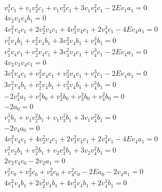 \documentclass{article}
\begin{document}
\begin{equation}
{\begin{array}{r}
v_{1}^{3} c_{1} + v_{1} v_{2}^{2} c_{1} + v_{1} v_{3}^{2} c_{1} + 3 v_{1} v_{4}^{2} c_{1} - 2 E v_{1} a_{1} = 0 \\
4 v_{2} v_{3} v_{4} b_{1} = 0 \\
4 v_{1}^{2} v_{4} c_{1} + 2 v_{2}^{2} v_{4} c_{1} + 4 v_{3}^{2} v_{4} c_{1} + 2 v_{4}^{3} c_{1} - 4 E v_{4} a_{1} = 0 \\
v_{1}^{2} v_{4} b_{1} + v_{2}^{2} v_{4} b_{1} + 3 v_{3}^{2} v_{4} b_{1} + v_{4}^{3} b_{1} = 0 \\
v_{1}^{2} v_{4} c_{1} + v_{2}^{2} v_{4} c_{1} + 3 v_{3}^{2} v_{4} c_{1} + v_{4}^{3} c_{1} - 2 E v_{4} a_{1} = 0 \\
4 v_{2} v_{3} v_{4} c_{1} = 0 \\
3 v_{1}^{2} v_{4} c_{1} + v_{2}^{2} v_{4} c_{1} + v_{3}^{2} v_{4} c_{1} + v_{4}^{3} c_{1} - 2 E v_{4} a_{1} = 0 \\
3 v_{1}^{2} v_{4} b_{1} + v_{2}^{2} v_{4} b_{1} + v_{3}^{2} v_{4} b_{1} + v_{4}^{3} b_{1} = 0 \\
-2 v_{4}^{2} a_{1} + v_{1}^{2} b_{0} + v_{2}^{2} b_{0} + v_{3}^{2} b_{0} + v_{4}^{2} b_{0} = 0 \\
-2 a_{0} = 0 \\
v_{1}^{3} b_{1} + v_{1} v_{2}^{2} b_{1} + v_{1} v_{3}^{2} b_{1} + 3 v_{1} v_{4}^{2} b_{1} = 0 \\
-2 v_{4} a_{0} = 0 \\
4 v_{1}^{2} v_{4} c_{1} + 4 v_{2}^{2} v_{4} c_{1} + 2 v_{3}^{2} v_{4} c_{1} + 2 v_{4}^{3} c_{1} - 4 E v_{4} a_{1} = 0 \\
v_{1}^{2} v_{2} b_{1} + v_{2}^{3} b_{1} + v_{2} v_{3}^{2} b_{1} + 3 v_{2} v_{4}^{2} b_{1} = 0 \\
2 v_{2} v_{4} c_{0} - 2 v_{2} a_{1} = 0 \\
v_{1}^{2} c_{0} + v_{2}^{2} c_{0} + v_{3}^{2} c_{0} + v_{4}^{2} c_{0} - 2 E a_{0} - 2 v_{4} a_{1} = 0 \\
4 v_{1}^{2} v_{4} b_{1} + 2 v_{2}^{2} v_{4} b_{1} + 4 v_{3}^{2} v_{4} b_{1} + 2 v_{4}^{3} b_{1} = 0 \\
\end{array}
}
\end{equation}

\end{document}
